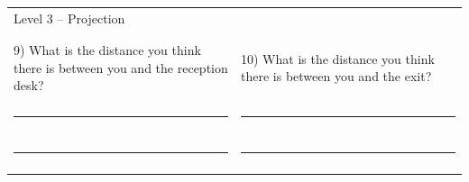 \begin{table}[!htb]
\begin{tabular}{p{0.5\linewidth} p{0.5\linewidth}}
    \end{tabular}
    \begin{tabular}{p{0.5\linewidth} p{0.5\linewidth}}
        \large{Level 3 – Projection}  &\\
        & \\
        & \\
        9)	What is the distance you think there is between you and the reception desk? & 10) What is the distance you think there is between you and the exit? \\
        & \\
        \rule{\linewidth}{.2mm} & \rule{\linewidth}{.2mm}\\
        & \\
        \rule{\linewidth}{.2mm} & \rule{\linewidth}{.2mm}\\
        & \\
    \end{tabular}
\end{table}
%
